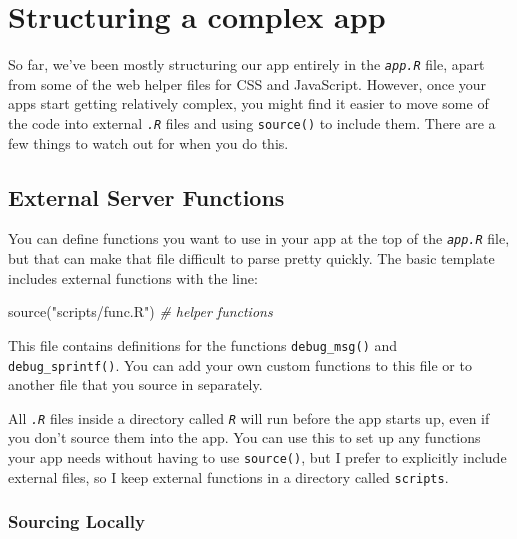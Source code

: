 \documentclass[
  oneside]{book}
\newenvironment{Shaded}{\begin{snugshade}}{\end{snugshade}}
\newcommand{\CommentTok}[1]{\textcolor[rgb]{0.56,0.35,0.01}{\textit{#1}}}
\newcommand{\FunctionTok}[1]{\textcolor[rgb]{0.00,0.00,0.00}{#1}}
\newcommand{\NormalTok}[1]{#1}
\newcommand{\StringTok}[1]{\textcolor[rgb]{0.31,0.60,0.02}{#1}}
\begin{document}
\hypertarget{structure}{%
\chapter{Structuring a complex app}\label{structure}}

So far, we've been mostly structuring our app entirely in the \textit{\texttt{app.R}} file, apart from some of the web helper files for CSS and JavaScript. However, once your apps start getting relatively complex, you might find it easier to move some of the code into external \textit{\texttt{.R}} files and using \texttt{source()} to include them. There are a few things to watch out for when you do this.

\hypertarget{external-server-functions}{%
\section{External Server Functions}\label{external-server-functions}}

You can define functions you want to use in your app at the top of the \textit{\texttt{app.R}} file, but that can make that file difficult to parse pretty quickly. The basic template includes external functions with the line:

\begin{Shaded}
\begin{Highlighting}[]
\FunctionTok{source}\NormalTok{(}\StringTok{"scripts/func.R"}\NormalTok{) }\CommentTok{\# helper functions}
\end{Highlighting}
\end{Shaded}

This file contains definitions for the functions \texttt{debug\_msg}\texttt{()} and \texttt{debug\_sprintf}\texttt{()}. You can add your own custom functions to this file or to another file that you source in separately.

\begin{warning}
All \textit{\texttt{.R}} files inside a directory called \textit{\texttt{R}} will run before the app starts up, even if you don't source them into the app. You can use this to set up any functions your app needs without having to use \texttt{source}\texttt{()}, but I prefer to explicitly include external files, so I keep external functions in a directory called \texttt{scripts}.

\end{warning}

\hypertarget{sourcing-locally}{%
\subsection{Sourcing Locally}\label{sourcing-locally}}
\end{document}

